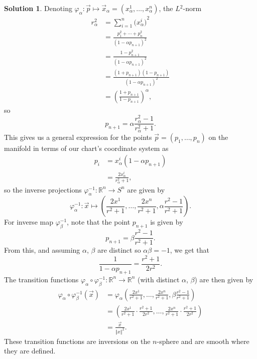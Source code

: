 \documentclass[11pt, a4paper]{report}
\theoremstyle{definition}
\newtheorem{sol}{Solution}[part]
\newcommand*{\norm}[1]{\ensuremath{\left\Vert#1\right\Vert}}
\begin{document}
\begin{sol}
Denoting $\varphi_\alpha: \vec{p} \mapsto \vec{x}_\alpha = \left(x_\alpha^1, \ldots, x_\alpha^n\right)$, the $L\!^2$-norm
\begin{align*}
    r_\alpha^2 &= \sum_{i = 1}^n {\bigl( x_\alpha^i \bigr)}^2 \\
               &= \frac{p_1^2 + \cdots + p_n^2}{{(1 - \alpha p_{n + 1})}^2} \\
               &= \frac{1 - p_{n + 1}^2}{{(1 - \alpha p_{n + 1})}^2} \\
               &= \frac{(1 + p_{n + 1})(1 - p_{n + 1})}{{(1 - \alpha p_{n + 1})}^2} \\
               &= {\left(\frac{1 + p_{n + 1}}{1 - p_{n + 1}}\right)}^\alpha,
\end{align*}
so
\[
    p_{n + 1} = \alpha\frac{r_\alpha^2 - 1}{r_\alpha^2 + 1}.
\]
This gives us a general expression for the points $\vec{p} = (p_1, \ldots, p_n)$ on the manifold in terms of our chart's coordinate system as
\begin{align*}
    p_i &= x_\alpha^i (1 - \alpha p_{n + 1}) \\
        &= \frac{2 x_\alpha^i}{r_\alpha^2 + 1},
\end{align*}
so the inverse projections $\varphi_\alpha^{-1}: \mathbb{R}^n \to S^n$ are given by
\[
    \varphi_\alpha^{-1}: \vec{x} \mapsto \left(\frac{2 x^1}{r^2 + 1}, \ldots, \frac{2 x^n}{r^2 + 1}, \alpha \frac{r^2 - 1}{r^2 + 1} \right).
\]
For inverse map $\varphi_\beta^{-1}$, note that the point $p_{n + 1}$ is given by
\[
    p_{n + 1} = \beta \frac{r^2 - 1}{r^2 + 1}.
\]
From this, and assuming $\alpha$, $\beta$ are distinct so $\alpha \beta = -1$, we get that
\[
    \frac{1}{1 - \alpha p_{n + 1}} = \frac{r^2 + 1}{2 r^2}.
\]
The transition functions $\varphi_\alpha \circ \varphi_\beta^{-1}: \mathbb{R}^n \to \mathbb{R}^n$ (with distinct $\alpha$, $\beta$) are then given by
\begin{align*}
    \varphi_\alpha \circ \varphi_\beta^{-1} (\vec{x}) &= \varphi_\alpha \left(\frac{2 x^1}{r^2 + 1}, \ldots, \frac{2 x^n}{r^2 + 1}, \beta \frac{r^2 - 1}{r^2 + 1} \right) \\
        &= \left(\frac{2 x^1}{r^2 + 1} \cdot \frac{r^2 + 1}{2 r^2},
                 \ldots,
                 \frac{2 x^n}{r^2 + 1} \cdot \frac{r^2 + 1}{2 r^2}
            \right) \\
        &= \frac{\vec{x}}{\norm{x}^2}.
\end{align*}
These transition functions are inversions on the $n$-sphere and are smooth where they are defined.

\end{sol}
\end{document}
